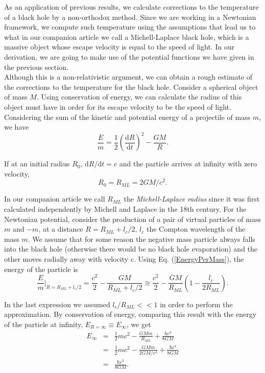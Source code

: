 \documentclass[nofootinbib,aps,prd,preprint,groupedaddress,showpacs,showkeys]{revtex4-1}
\newcommand{\dif}{\mathrm{d}}
\begin{document}
\noindent As an application of previous results, we calculate corrections to the temperature of a black hole by a non-orthodox method. Since we are working in a Newtonian framework, we compute such temperature using the assumptions that lead us to what in our companion article \cite{MOR} we call a Michell-Laplace black hole, which is a massive object whose escape velocity is equal to the speed of light. In our derivation, we are going to make use of the potential functions we have given in the previous section.\\
\indent Although this is a non-relativistic argument, we can obtain a rough estimate of the corrections to the temperature for the black hole. Consider a spherical object of mass $M$. Using conservation of energy, we can calculate the radius of this object must have in order for its escape velocity to be the speed of light. Considering the sum of the kinetic and potential energy of a projectile of mass $m$, we have
\begin{equation}
\frac{E}{m} = \frac{1}{2} \left( \frac{\dif R}{\dif t} \right)^2 - \frac{GM}{R}. \label{EnergyPerMass}
\end{equation}

\noindent If at an initial radius $R_0$, $\dif R/\dif t = c$ and the particle arrives at infinity with zero velocity,
\begin{equation}
R_0 = R_{ML} = 2GM / c^2.
\end{equation}

\noindent In our companion article we call $R_{ML}$ the \textit{Michell-Laplace radius} since it was first calculated independently by Michell \cite{Michell} and Laplace \cite{Laplace} in the 18th century. For the Newtonian potential, consider the production of a pair of virtual particles of mass $m$ and $-m$, at a distance $R = R_{ML} + l_c /2$, $l_c$ the Compton wavelength of the mass $m$. We assume that for some reason the negative mass particle always falls into the black hole (otherwise there would be no black hole evaporation) and the other moves radially away with velocity c. Using Eq. (\ref{EnergyPerMass}), the energy of the particle is
\begin{equation}
\frac{E}{m} \Big|_{R = R_{ML} + l_c / 2} = \frac{c^2}{2} - \frac{GM}{R_{ML} + l_c / 2} \cong \frac{c^2}{2} - \frac{GM}{R_{ML}} \left( 1 - \frac{l_c}{2R_{ML}} \right).
\end{equation}

\noindent In the last expression we assumed $l_c / R_{ML} <<1$ in order to perform the approximation. By conservation of energy, comparing this result with the energy of the particle at infinity, $E_{R = \infty} \equiv E_{\infty}$, we get
\begin{eqnarray}
E_{\infty} &=& \frac{1}{2} m c^2 - \frac{GMm}{R_{ML}} + \frac{\hbar c^3}{8 GM} \\
&=& \frac{1}{2} m c^2 - \frac{GMm}{2GM / c^2} + \frac{\hbar c^3}{8GM} \\
&=& \frac{\hbar c^3}{8 GM}.
\end{eqnarray}
\end{document}
